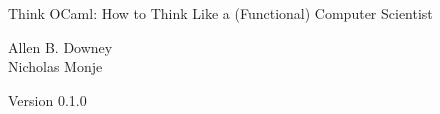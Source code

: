 \documentclass[10pt]{book}
\newcommand{\thetitle}{Think OCaml: How to Think Like a (Functional) Computer Scientist}
\newcommand{\theversion}{0.1.0}
\begin{document}

\begin{htmlonly}


{\Large \thetitle}

{\large Allen B. Downey\\}
{\small Nicholas Monje\\}

Version \theversion

\setcounter{chapter}{-1}

\end{htmlonly}












\end{document}

